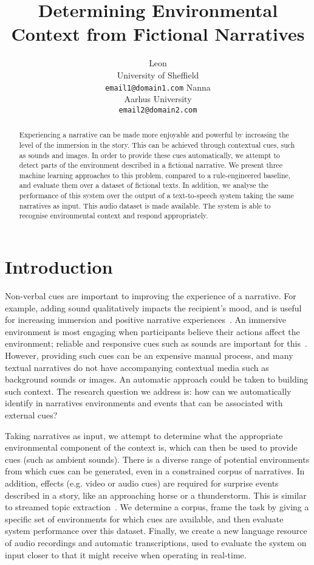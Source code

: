 \documentclass[11pt]{article}
\title{Determining Environmental Context from Fictional Narratives}
\author{Leon\\
  University of Sheffield\\
  {\tt email1@domain1.com}  \And
  Nanna\\
  Aarhus University\\
  {\tt  email2@domain2.com}}
\date{}
\begin{document}
\maketitle
\begin{abstract}
Experiencing a narrative can be made more enjoyable and powerful by increasing the level of the immersion in the story.
This can be achieved through contextual cues, such as sounds and images.
In order to provide these cues automatically, we attempt to detect parts of the environment described in a fictional narrative.
We present three machine learning approaches to this problem, compared to a rule-engineered baseline, and evaluate them over a dataset of fictional texts.
In addition, we analyse the performance of this system over the output of a text-to-speech system taking the same narratives as input.
This audio dataset is made available.
The system is able to recognise environmental context and respond appropriately.
\end{abstract}


\section{Introduction}

Non-verbal cues are important to improving the experience of a narrative. 
For example, adding sound qualitatively impacts the recipient's mood, and is useful for increasing immersion and positive narrative experiences~\cite{ermi2005fundamental,madden2009collaborative,huiberts2010captivating}.
An immersive environment is most engaging when participants believe their actions affect the environment; reliable and responsive cues such as sounds are important for this~\cite{bobick1999kidsroom}.
However, providing such cues can be an expensive manual process, and many textual narratives do not have accompanying contextual media such as background sounds or images.
An automatic approach could be taken to building such context.
The research question we address is: how can we automatically identify in narratives environments and events that can be associated with external cues?

Taking narratives as input, we attempt to determine what the appropriate environmental component of the context is, which can then be used to provide cues (such as ambient sounds).
There is a diverse range of potential environments from which cues can be generated, even in a constrained corpus of narratives.
In addition, effects (e.g. video or audio cues) are required for surprise events described in a story, like an approaching horse or a thunderstorm.
This is similar to streamed topic extraction~\cite{allan2002introduction,preotiuc2012trendminer}.
We determine a corpus, frame the task by giving a specific set of environments for which cues are available, and then evaluate system performance over this dataset.
Finally, we create a new language resource of audio recordings and automatic transcriptions, used to evaluate the system on input closer to that it might receive when operating in real-time.
\end{document}
